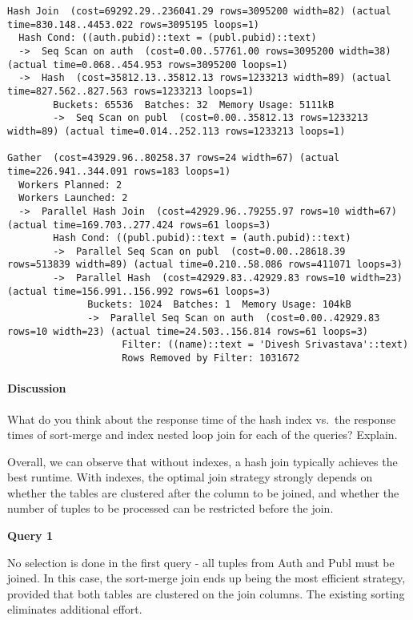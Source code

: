 \documentclass[11pt]{scrartcl}
\begin{document}
{\small
\parskip0pt\begin{verbatim}
Hash Join  (cost=69292.29..236041.29 rows=3095200 width=82) (actual time=830.148..4453.022 rows=3095195 loops=1)
  Hash Cond: ((auth.pubid)::text = (publ.pubid)::text)
  ->  Seq Scan on auth  (cost=0.00..57761.00 rows=3095200 width=38) (actual time=0.068..454.953 rows=3095200 loops=1)
  ->  Hash  (cost=35812.13..35812.13 rows=1233213 width=89) (actual time=827.562..827.563 rows=1233213 loops=1)
        Buckets: 65536  Batches: 32  Memory Usage: 5111kB
        ->  Seq Scan on publ  (cost=0.00..35812.13 rows=1233213 width=89) (actual time=0.014..252.113 rows=1233213 loops=1)

Gather  (cost=43929.96..80258.37 rows=24 width=67) (actual time=226.941..344.091 rows=183 loops=1)
  Workers Planned: 2
  Workers Launched: 2
  ->  Parallel Hash Join  (cost=42929.96..79255.97 rows=10 width=67) (actual time=169.703..277.424 rows=61 loops=3)
        Hash Cond: ((publ.pubid)::text = (auth.pubid)::text)
        ->  Parallel Seq Scan on publ  (cost=0.00..28618.39 rows=513839 width=89) (actual time=0.210..58.086 rows=411071 loops=3)
        ->  Parallel Hash  (cost=42929.83..42929.83 rows=10 width=23) (actual time=156.991..156.992 rows=61 loops=3)
              Buckets: 1024  Batches: 1  Memory Usage: 104kB
              ->  Parallel Seq Scan on auth  (cost=0.00..42929.83 rows=10 width=23) (actual time=24.503..156.814 rows=61 loops=3)
                    Filter: ((name)::text = 'Divesh Srivastava'::text)
                    Rows Removed by Filter: 1031672
\end{verbatim}}

\paragraph{Discussion}

What do you think about the response time of the hash index vs.\ the response times of sort-merge and index nested loop join for each of the queries? Explain.

Overall, we can observe that without indexes, a hash join typically
achieves the best runtime.  With indexes, the optimal join strategy
strongly depends on whether the tables are clustered after the column to
be joined, and whether the number of tuples to be processed can be
restricted before the join.

\textbf{Query 1}

No selection is done in the first query - all tuples from Auth and Publ
must be joined.  In this case, the sort-merge join ends up being the
most efficient strategy, provided that both tables are clustered on the
join columns.  The existing sorting eliminates additional effort.
\end{document}
